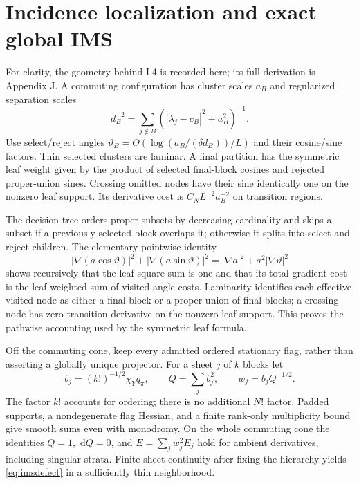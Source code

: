 \documentclass[11pt,letterpaper]{article}
\theoremstyle{definition}\newtheorem{hypothesis}[theorem]{Hypothesis}
\newcommand{\dd}{\,\mathrm{d}}
\numberwithin{equation}{section}
\begin{document}
\section{Incidence localization and exact global IMS}
For clarity, the geometry behind L4 is recorded here; its full derivation is Appendix J. A commuting configuration has cluster scales $a_B$ and regularized separation scales
\begin{equation}
 d_B^{-2}=\sum_{j\notin B}(|\lambda_j-c_B|^2+a_B^2)^{-1}.
\end{equation}
Use select/reject angles
$\vartheta_B=\Theta(\log(a_B/(\delta d_B))/L)$ and their cosine/sine factors. Thin selected clusters are laminar. A final partition has the symmetric leaf weight given by the product of selected final-block cosines and rejected proper-union sines. Crossing omitted nodes have their sine identically one on the nonzero leaf support. Its derivative cost is $C_NL^{-2}a_B^{-2}$ on transition regions.

The decision tree orders proper subsets by decreasing cardinality and skips a subset if a previously selected block overlaps it; otherwise it splits into select and reject children. The elementary pointwise identity
\begin{equation}
 |\nabla(a\cos\vartheta)|^2+|\nabla(a\sin\vartheta)|^2
 =|\nabla a|^2+a^2|\nabla\vartheta|^2
\end{equation}
shows recursively that the leaf square sum is one and that its total gradient cost is the leaf-weighted sum of visited angle costs. Laminarity identifies each effective visited node as either a final block or a proper union of final blocks; a crossing node has zero transition derivative on the nonzero leaf support. This proves the pathwise accounting used by the symmetric leaf formula.

Off the commuting cone, keep every admitted ordered stationary flag, rather than asserting a globally unique projector. For a sheet $j$ of $k$ blocks let
\begin{equation}
 b_j=(k!)^{-1/2}\chi_Yq_\pi,\qquad
 Q=\sum_jb_j^2,\qquad w_j=b_jQ^{-1/2}.
\end{equation}
The factor $k!$ accounts for ordering; there is no additional $N!$ factor. Padded supports, a nondegenerate flag Hessian, and a finite rank-only multiplicity bound give smooth sums even with monodromy. On the whole commuting cone the identities $Q=1$, $\dd Q=0$, and $E=\sum_jw_j^2E_j$ hold for ambient derivatives, including singular strata. Finite-sheet continuity after fixing the hierarchy yields \eqref{eq:imsdefect} in a sufficiently thin neighborhood.
\end{document}

